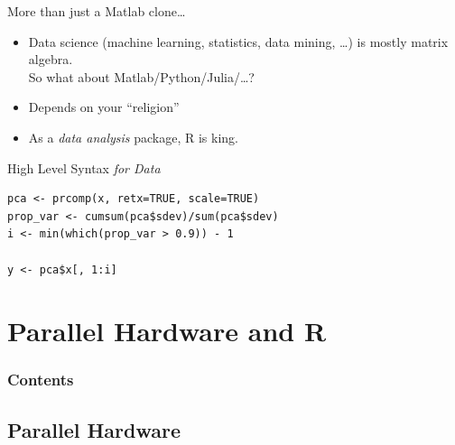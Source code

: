 \begin{frame}
  \begin{block}{More than just a Matlab clone\dots}\pause
  \begin{itemize}[<+-|alert@+>]
    \item Data science (machine learning, statistics, data mining, \dots) is 
mostly matrix algebra.  \\[.2cm]
     So what about Matlab/Python/Julia/\dots ?
    \item Depends on your ``religion'' 
    \item As a \emph{data analysis} package, R is king.
  \end{itemize}
\end{block}
\end{frame}



\begin{frame}[fragile]
\begin{block}{High Level Syntax \emph{for Data}}\pause
\begin{lstlisting}
pca <- prcomp(x, retx=TRUE, scale=TRUE)
prop_var <- cumsum(pca$sdev)/sum(pca$sdev)
i <- min(which(prop_var > 0.9)) - 1

y <- pca$x[, 1:i]
\end{lstlisting}
\end{block}
\end{frame}

















\section{Parallel Hardware and R}

\hidenum
\begin{frame}[noframenumbering]
\frametitle{Contents}
 \tableofcontents[currentsection,hideothersubsections,sectionstyle=show/hide]
\end{frame}
\shownum

\subsection{Parallel Hardware}

%   



